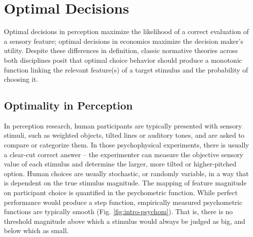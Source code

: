 \documentclass[a4paper, nobind]{templates/ociamthesis}
\begin{document}
\hypertarget{optimality}{%
\section{Optimal Decisions}\label{optimality}}

Optimal decisions in perception maximize the likelihood of a correct evaluation of a sensory feature; optimal decisions in economics maximize the decision maker's utility. Despite these differences in definition, classic normative theories across both disciplines posit that optimal choice behavior should produce a monotonic function linking the relevant feature(s) of a target stimulus and the probability of choosing it.

\hypertarget{optimality-perc}{%
\subsection{Optimality in Perception}\label{optimality-perc}}

In perception research, human participants are typically presented with sensory stimuli, such as weighted objects, tilted lines or auditory tones, and are asked to compare or categorize them. In those psychophysical experiments, there is usually a clear-cut correct answer -- the experimenter can measure the objective sensory value of each stimulus and determine the larger, more tilted or higher-pitched option. Human choices are usually stochastic, or randomly variable, in a way that is dependent on the true stimulus magnitude. The mapping of feature magnitude on participant choice is quantified in the psychometric function. While perfect performance would produce a step function, empirically measured psychometric functions are typically smooth (Fig. \ref{fig:intro-psychom}). That is, there is no threshold magnitude above which a stimulus would always be judged as big, and below which as small.
\end{document}
